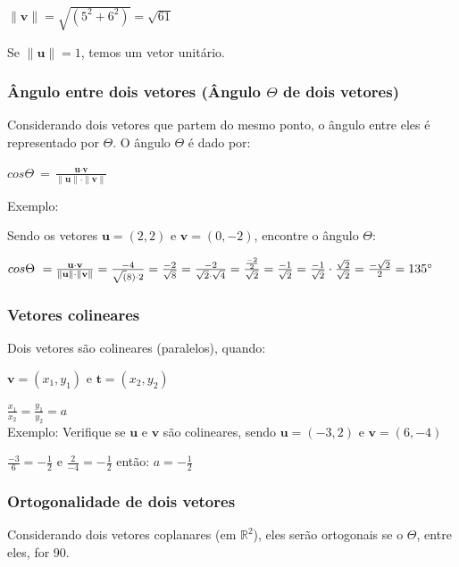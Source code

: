 \documentclass[12pt]{article}
\begin{document}
\(\|\textbf{v}\| = \sqrt{(5^2+6^2)} = \sqrt{61}\)


Se \(\|\textbf{u}\| = 1\), temos um vetor unitário.

\subsubsection{Ângulo entre dois vetores (Ângulo $\Theta$ de dois vetores)}

Considerando dois vetores que partem do mesmo ponto, o ângulo entre eles é representado por $\Theta$. O ângulo $\Theta$ é dado por:

\(cos \Theta\ = \frac{\textbf{u}  \cdot  \textbf{v}}{\|\textbf{u}\| \cdot \|\textbf{v}\|}\)

Exemplo:

Sendo os vetores \(\textbf{u} = (2,2)\) e \(\textbf{v}=(0, -2)\), encontre o ângulo $\Theta$:

\(cos \Theta\ = \frac{\textbf{u}  \cdot  \textbf{v}}{\|\textbf{u}\| \cdot \|\textbf{v}\|} = \frac{-4}{\sqrt(8) \cdot 2} = \frac{-2}{\sqrt{8}}=\frac{-2}{\sqrt{2} \cdot \sqrt{4}}=\frac{\frac{-2}{2}}{\sqrt{2}} = \frac{-1}{\sqrt{2}} = \frac{-1}{\sqrt{2}}  \cdot  \frac{\sqrt{2}}{\sqrt{2}} = \frac{-\sqrt{2}}{2} = 135\degree\)

\subsubsection{Vetores colineares}

Dois vetores são colineares (paralelos), quando:

\(\textbf{v} = (x_{1}, y_{1})\) e \(\textbf{t} = (x_{2}, y_{2})\)

\(\frac{x_{1}}{x_{2}} = \frac{y_{1}}{y_{2}} = \textit{a}\)
\\

Exemplo: Verifique se \(\textbf{u}\) e \(\textbf{v}\) são colineares, sendo \(\textbf{u} = (-3, 2)\) e \(\textbf{v}=(6,-4)\)

\(\frac{-3}{6} = -\frac{1}{2}\) e \(\frac{2}{-4} = -\frac{1}{2}\) então: \(\textit{a} = -\frac{1}{2}\)

\subsubsection{Ortogonalidade de dois vetores}

Considerando dois vetores coplanares (em \(\mathbb{R}^2\)), eles serão ortogonais se o $\Theta$, entre eles, for 90\degree.
\end{document}
